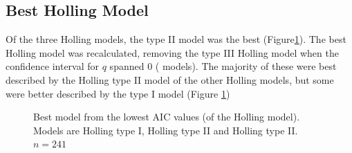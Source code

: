 \documentclass{article}
\begin{document}
\subsection{Best Holling Model}
Of the three Holling models, the type II model was the best (Figure\ref{fig:bestholandrecalmodel}). The best Holling model was recalculated, removing the type III Holling model when the confidence interval for $q$ spanned $0$ ($$ models). The majority of these were best described by the Holling type II model of the other Holling models, but some were better described by the type I model (Figure \ref{fig:bestholandrecalmodel})
\begin{figure}[h!]
\centering
{}
\caption{Best model from the lowest AIC values (of the Holling model). Models are Holling type I, Holling type II and Holling type II. $n=241$}
\label{fig:bestholandrecalmodel}
\end{figure}
\end{document}
